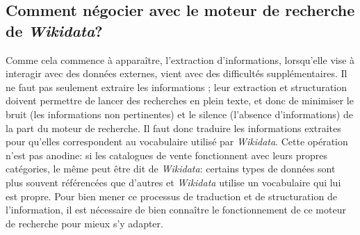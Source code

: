 \documentclass[a4paper, 12pt, twoside]{book}
\newcommand{\wkd}{\textit{Wikidata}}
\begin{document}
\subsection{Comment négocier avec le moteur de recherche de \wkd{}?}
Comme cela commence à apparaître, l'extraction d'informations, lorsqu'elle vise à interagir avec des données externes, vient avec des difficultés supplémentaires. Il ne faut pas seulement extraire les informations ; leur extraction et structuration doivent permettre de lancer des recherches en plein texte, et donc de minimiser le bruit (les informations non pertinentes) et le silence (l'absence d'informations) de la part du moteur de recherche. Il faut donc traduire les informations extraites pour qu'elles correspondent au vocabulaire utilisé par \wkd{}. Cette opération n'est pas anodine: si les catalogues de vente fonctionnent avec leurs propres catégories, le même peut être dit de \wkd{}: certains types de données sont plus souvent référencées que d'autres et \wkd{} utilise un vocabulaire qui lui est propre. Pour bien mener ce processus de traduction et de structuration de l'information, il est nécessaire de bien connaître le fonctionnement de ce moteur de recherche pour mieux s'y adapter.
\end{document}
